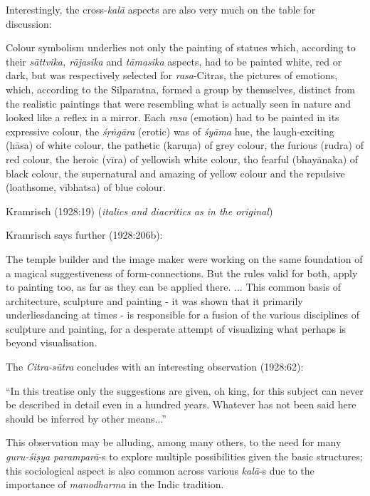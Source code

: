 Interestingly, the cross-\textsl{kalā} aspects are also very much on the table for discussion:

\begin{myquote}
Colour symbolism underlies not only the painting of statues which, according to their \textsl{sāttvika, rājasika} and \textsl{tāmasika} aspects, had to be painted white, red or dark, but was respectively selected for \textsl{rasa}-Citras, the pictures of emotions, which, according to the Silparatna, formed a group by themselves, distinct from the realistic paintings that were resembling what is actually seen in nature and looked like a reflex in a mirror. Each \textsl{rasa} (emotion) had to be painted in its expressive colour, the \textsl{śṛṅgāra} (erotic) was of \textsl{śyāma} hue, the laugh-exciting (hāsa) of white colour, the pathetic (karuṇa) of grey colour, the furious (rudra) of red colour, the heroic (vīra) of yellowish white colour, tho fearful (bhayānaka) of black colour, the supernatural and amazing of yellow colour and the repulsive (loathsome, vībhatsa) of blue colour.

\hfill Kramrisch (1928:19) (\textsl{italics and diacritics as in the original})
\end{myquote}

Kramrisch says further (1928:206b):

\begin{myquote}
The temple builder and the image maker were working on the same foundation of a magical suggestiveness of form-connections. But the rules valid for both, apply to painting too, as far as they can be applied there. ... This common basis of architecture, sculpture and painting - it was shown that it primarily underliesdancing at times - is responsible for a fusion of the various disciplines of sculpture and painting, for a desperate attempt of visualizing what perhaps is beyond visualisation.
\end{myquote}

The \textsl{Citra-sūtra} concludes with an interesting observation (1928:62): 

\begin{myquote}
“In this treatise only the suggestions are given, oh king, for this subject can never be described in detail even in a hundred years. Whatever has not been said here should be inferred by other means...” 
\end{myquote}

This observation may be alluding, among many others, to the need for many \textsl{guru-śiṣya paramparā}-s to explore multiple possibilities given the basic structures; this sociological aspect is also common across various \textsl{kalā}-s due to the importance of \textsl{manodharma} in the Indic tradition. 


